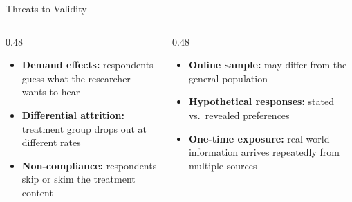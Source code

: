 \documentclass[aspectratio=169, 11pt]{beamer}
\begin{document}
\begin{frame}[t]{Threats to Validity}
\begin{columns}[T]
\begin{column}{0.48\textwidth}
\begin{warningbox}
\begin{itemize}
  \setlength\itemsep{0.3em}
  \item \textbf{Demand effects:} respondents guess what the researcher wants to hear
  \item \textbf{Differential attrition:} treatment group drops out at different rates
  \item \textbf{Non-compliance:} respondents skip or skim the treatment content
\end{itemize}
\end{warningbox}
\end{column}
\begin{column}{0.48\textwidth}
\begin{warningbox}
\begin{itemize}
  \setlength\itemsep{0.3em}
  \item \textbf{Online sample:} may differ from the general population
  \item \textbf{Hypothetical responses:} stated vs.\ revealed preferences
  \item \textbf{One-time exposure:} real-world information arrives repeatedly from multiple sources
\end{itemize}
\end{warningbox}
\end{column}
\end{columns}
\vspace{0.5em}
\end{frame}

\end{document}
